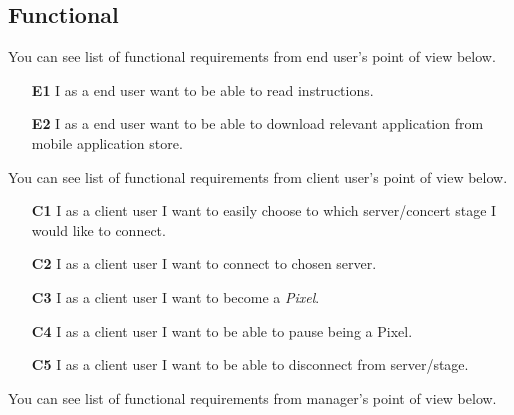 \subsection{Functional}
You can see list of functional requirements from end user's point of view below.
\begin{enumerate}
	\item[\textbf{E1}] \label{req_E1}
		I as a end user want to be able to read instructions.
		
	\item[\textbf{E2}] \label{req_E2}
		I as a end user want to be able to download relevant application from mobile application store.
\end{enumerate}
You can see list of functional requirements from client user's point of view below.
\begin{enumerate}
	\item[\textbf{C1}] \label{req_C1}
		I as a client user I want to easily choose to which server/concert stage I would like to connect.
		
	\item[\textbf{C2}] \label{req_C2}
		I as a client user I want to connect to chosen server.
		
	\item[\textbf{C3}] \label{req_C3}
		I as a client user I want to become a \emph{Pixel}.
	
	\item[\textbf{C4}] \label{req_C4}
		I as a client user I want to be able to pause being a Pixel.
		
	\item[\textbf{C5}] \label{req_C5}
		I as a client user I want to be able to disconnect from server/stage.
\end{enumerate}
You can see list of functional requirements from manager's point of view below.
